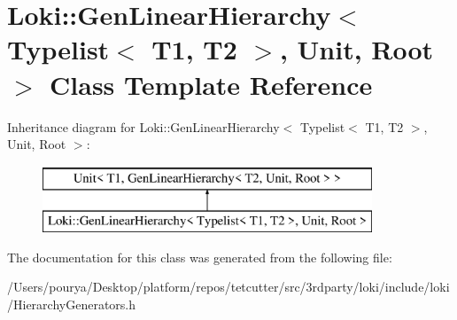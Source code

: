 \hypertarget{classLoki_1_1GenLinearHierarchy_3_01Typelist_3_01T1_00_01T2_01_4_00_01Unit_00_01Root_01_4}{}\section{Loki\+:\+:Gen\+Linear\+Hierarchy$<$ Typelist$<$ T1, T2 $>$, Unit, Root $>$ Class Template Reference}
\label{classLoki_1_1GenLinearHierarchy_3_01Typelist_3_01T1_00_01T2_01_4_00_01Unit_00_01Root_01_4}
Inheritance diagram for Loki\+:\+:Gen\+Linear\+Hierarchy$<$ Typelist$<$ T1, T2 $>$, Unit, Root $>$\+:\begin{figure}[H]
\begin{center}
\leavevmode
\includegraphics[height=2.000000cm]{classLoki_1_1GenLinearHierarchy_3_01Typelist_3_01T1_00_01T2_01_4_00_01Unit_00_01Root_01_4}
\end{center}
\end{figure}


The documentation for this class was generated from the following file\+:\begin{DoxyCompactItemize}
\item 
/\+Users/pourya/\+Desktop/platform/repos/tetcutter/src/3rdparty/loki/include/loki/Hierarchy\+Generators.\+h\end{DoxyCompactItemize}
